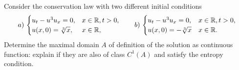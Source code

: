 \newpage
\begin{exercise}
    Consider the conservation law with two different initial conditions
    \begin{equation*}
        a)\,\begin{cases}
            u_t - u^3 u_x = 0,    & x \in \mathbb{R}, t > 0, \\
            u(x,0) = \sqrt[3]{x}, & x \in \mathbb{R},
        \end{cases}
        \qquad
        b)\,\begin{cases}
            u_t - u^3 u_x = 0,    & x \in \mathbb{R}, t > 0, \\
            u(x,0) = -\sqrt[3]{x} & x \in \mathbb{R}.
        \end{cases}
    \end{equation*}
    Determine the maximal domain \(A\) of definition of the solution as continuous function: explain if they are also of class \(C^1(A)\) and satisfy the entropy condition.
\end{exercise}
